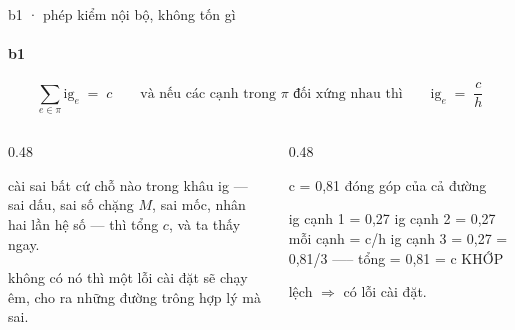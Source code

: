 \begin{frame}[fragile]{b1 · phép kiểm nội bộ, không tốn gì}
  \framesubtitle{b1}
  \[
    \sum_{e \in \pi} \mathrm{ig}_e \;=\; c
    \qquad\text{và nếu các cạnh trong } \pi \text{ đối xứng nhau thì}\qquad
    \mathrm{ig}_e \;=\; \frac{c}{h}
  \]

  \vspace{0.5em}
  \begin{columns}[t]
  \begin{column}{0.48\textwidth}
    \begin{keyb}[title={vì sao đây là thứ quý nhất của tầng b}]
      cài sai bất cứ chỗ nào trong khâu ig — sai dấu, sai số chặng $M$, sai mốc,
      nhân hai lần hệ số — thì tổng  $c$, và ta thấy ngay.
      \vspace{0.3em}

      không có nó thì một lỗi cài đặt sẽ chạy êm, cho ra những đường trông
      hợp lý mà sai.
    \end{keyb}
  \end{column}
  \begin{column}{0.48\textwidth}
    \begin{bx}[title={một đường, ba cạnh}]
      \begin{dia}
c = 0,81          đóng góp của cả đường

ig cạnh 1 = 0,27
ig cạnh 2 = 0,27      mỗi cạnh = c/h
ig cạnh 3 = 0,27           = 0,81/3
            -----
tổng      = 0,81  = c        KHỚP
      \end{dia}
      \vspace{0.2em}
      lệch $\Rightarrow$ có lỗi cài đặt. 
    \end{bx}
  \end{column}
  \end{columns}
\end{frame}

